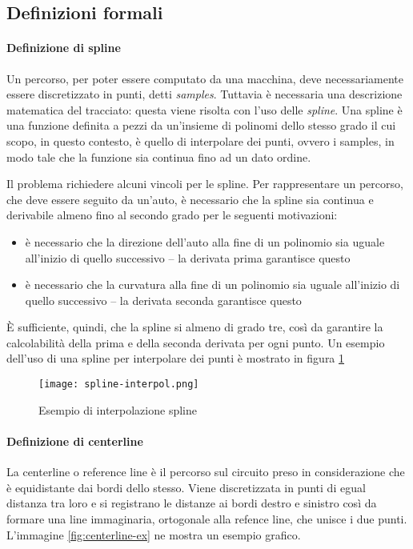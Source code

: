 \subsection{Definizioni formali}
\label{sub:formal-def}
\paragraph{Definizione di spline \cite{olausson2021optimal} \cite{globalplanning-lec}}
\label{par:spline-def}
Un percorso, per poter essere computato da una macchina, deve necessariamente essere discretizzato in
punti, detti \textit{samples}.
Tuttavia è necessaria una descrizione matematica del tracciato: questa viene risolta con l'uso delle
\textit{spline}. Una spline è una funzione definita a pezzi da un'insieme di polinomi dello stesso grado
il cui scopo, in questo contesto, è quello di interpolare dei punti, ovvero i samples, in modo tale che
la funzione sia continua fino ad un dato ordine.

Il problema richiedere alcuni vincoli per le spline. Per rappresentare un percorso, che deve essere
seguito da un'auto, è necessario che la spline sia continua e derivabile almeno fino al secondo grado per
le seguenti motivazioni:
\begin{itemize}
	\item è necessario che la direzione dell'auto alla fine di un polinomio sia uguale all'inizio di
		quello successivo -- la derivata prima garantisce questo 
	\item è necessario che la curvatura alla fine di un polinomio sia uguale all'inizio di quello
		successivo -- la derivata seconda garantisce questo
\end{itemize}
È sufficiente, quindi, che la spline si almeno di grado tre, così da garantire la calcolabilità della
prima e della seconda derivata per ogni punto.
Un esempio dell'uso di una spline per interpolare dei punti è mostrato in figura \ref{fig:spline}

\begin{figure}[H]
	\begin{center}
		\texttt{[image: spline-interpol.png]}
	\end{center}
	\caption{Esempio di interpolazione spline}\label{fig:spline}
\end{figure}

\paragraph{Definizione di centerline}
\label{par:centerline}
La centerline o reference line è il percorso sul circuito preso in considerazione che è equidistante dai
bordi dello stesso. Viene discretizzata in punti di egual distanza tra loro e si registrano le distanze
ai bordi destro e sinistro così da formare una line immaginaria, ortogonale alla refence line, che unisce
i due punti. L'immagine \ref{fig:centerline-ex} ne mostra un esempio grafico.

